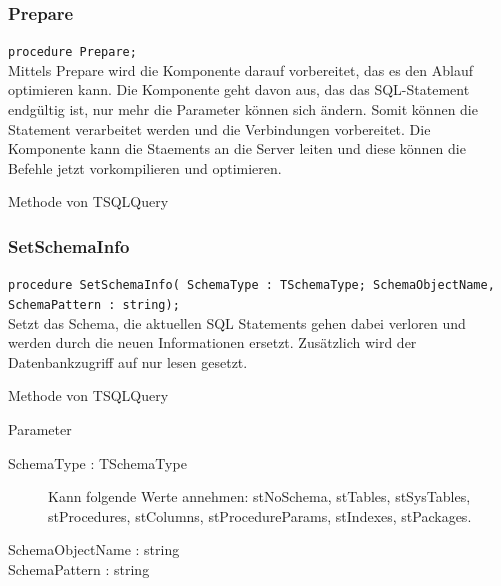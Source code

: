 \subsubsection{Prepare}
\begin{description}
  \item \texttt{procedure Prepare;}\\
Mittels Prepare wird die Komponente darauf vorbereitet, das es den Ablauf optimieren kann. Die Komponente geht davon aus, das das SQL-Statement endgültig ist, nur mehr die Parameter können sich ändern. Somit können die Statement verarbeitet werden und die Verbindungen vorbereitet. Die Komponente kann die Staements an die Server leiten und diese können die Befehle jetzt vorkompilieren und optimieren.
  \begin{description}
    \item Methode von TSQLQuery
  \end{description}
\end{description}

\subsubsection{SetSchemaInfo}
\begin{description}
  \item \texttt{procedure SetSchemaInfo( SchemaType : TSchema\-Type; Schema\-Object\-Name, Schema\-Pattern : string);}\\
Setzt das Schema, die aktuellen SQL Statements gehen dabei verloren und werden durch die neuen Informationen ersetzt. Zusätzlich wird der Datenbankzugriff auf nur lesen gesetzt.
  \begin{description}
    \item Methode von TSQLQuery
  \end{description}
  \begin{description}
    \item Parameter
    \begin{description}
      \item[SchemaType : TSchemaType] Kann folgende Werte annehmen: stNoSchema, stTables, stSysTables, stProcedures, stColumns, stProcedureParams, stIndexes, stPackages.
      \item[SchemaObjectName : string] 
      \item[SchemaPattern : string]
    \end{description}
  \end{description}
\end{description}

